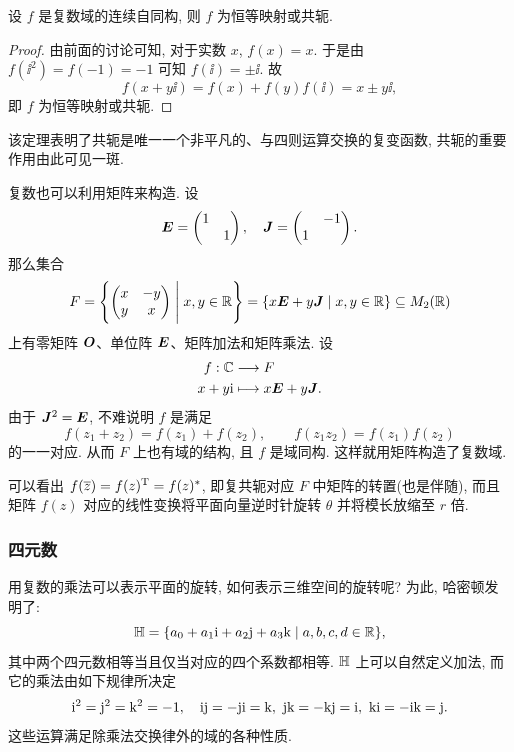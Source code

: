 \begin{theorem}
  设 $f$ 是复数域的连续自同构, 则 $f$ 为恒等映射或共轭.
\end{theorem}

\begin{proof}
  由前面的讨论可知, 对于实数 $x$, $f(x)=x$.
  于是由 $f(\ii^2)=f(-1)=-1$ 可知 $f(\ii)=\pm\ii$.
  故
  \[
    f(x+y\ii)=f(x)+f(y)f(\ii)=x\pm y\ii,
  \]
  即 $f$ 为恒等映射或共轭.
\end{proof}

该定理表明了共轭是唯一一个非平凡的、与四则运算交换的复变函数, 共轭的重要作用由此可见一斑.

复数也可以利用矩阵来构造.
设
\[
  {\boldsymbol{E}}=\begin{pmatrix}1& \\&1\end{pmatrix},\quad
  {\boldsymbol{J}}=\begin{pmatrix}&-1\\1&\end{pmatrix}.
\]
那么集合
\[
  F=\Biggl\{\begin{pmatrix}
    x&-y\\y&x
  \end{pmatrix}\Biggm\vert x,y\in{\mathbb{R}}\Biggr\}
  =\{x{\boldsymbol{E}}+y{\boldsymbol{J}}\mid x,y\in{\mathbb{R}}\}
  \subseteq M_2({\mathbb{R}})
\]
上有零矩阵 ${\boldsymbol{O}}$、单位阵 ${\boldsymbol{E}}$、矩阵加法和矩阵乘法.
设
\begin{align*}
  f:{\mathbb{C}}&\longrightarrow F\\
  x+y\mathrm{i}&\longmapsto x{\boldsymbol{E}}+y{\boldsymbol{J}}.
\end{align*}
由于 ${\boldsymbol{J}}^2={\boldsymbol{E}}$, 不难说明 $f$ 是满足
\[
  f(z_1+z_2)=f(z_1)+f(z_2),\qquad
  f(z_1z_2)=f(z_1)f(z_2)
\]
的一一对应.
从而 $F$ 上也有域的结构, 且 $f$ 是域同构.
这样就用矩阵构造了复数域.

可以看出 $f(\overline z)=f(z)^{\mathrm{T}}=f(z)^*$, 即复共轭对应 $F$ 中矩阵的转置(也是伴随), 而且矩阵 $f(z)$ 对应的线性变换将平面向量逆时针旋转 $\theta$ 并将模长放缩至 $r$ 倍.


\subsubsection{四元数}
\label{sssec:quaternion-number}

用复数的乘法可以表示平面的旋转, 如何表示三维空间的旋转呢?
为此, 哈密顿发明了:
\[
  {\mathbb{H}}=\{a_0+a_1\mathrm{i}+a_2\mathrm{j}+a_3\mathrm{k}\mid a,b,c,d\in{\mathbb{R}}\},
\]
其中两个四元数相等当且仅当对应的四个系数都相等.
${\mathbb{H}}$ 上可以自然定义加法, 而它的乘法由如下规律所决定
\[
  \ii^2=\jj^2=\kk^2=-1,\quad 
  \ii\jj=-\jj\ii=\kk,\ 
  \jj\kk=-\kk\jj=\ii,\ 
  \kk\ii=-\ii\kk=\jj.
\]
这些运算满足除乘法交换律外的域的各种性质.

